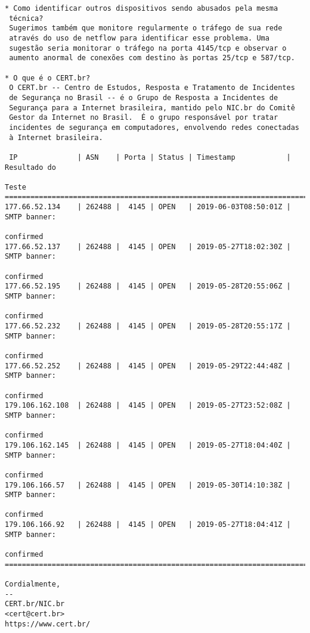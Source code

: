 \begin{verbatim}
* Como identificar outros dispositivos sendo abusados pela mesma
 técnica?
 Sugerimos também que monitore regularmente o tráfego de sua rede
 através do uso de netflow para identificar esse problema. Uma
 sugestão seria monitorar o tráfego na porta 4145/tcp e observar o
 aumento anormal de conexões com destino às portas 25/tcp e 587/tcp.

* O que é o CERT.br?
 O CERT.br -- Centro de Estudos, Resposta e Tratamento de Incidentes
 de Segurança no Brasil -- é o Grupo de Resposta a Incidentes de
 Segurança para a Internet brasileira, mantido pelo NIC.br do Comitê
 Gestor da Internet no Brasil.  É o grupo responsável por tratar
 incidentes de segurança em computadores, envolvendo redes conectadas
 à Internet brasileira.

 IP              | ASN    | Porta | Status | Timestamp            | Resultado do 
                                                                    Teste
=============================================================================
177.66.52.134    | 262488 |  4145 | OPEN   | 2019-06-03T08:50:01Z | SMTP banner: 
                                                                    confirmed
177.66.52.137    | 262488 |  4145 | OPEN   | 2019-05-27T18:02:30Z | SMTP banner: 
                                                                    confirmed
177.66.52.195    | 262488 |  4145 | OPEN   | 2019-05-28T20:55:06Z | SMTP banner: 
                                                                    confirmed
177.66.52.232    | 262488 |  4145 | OPEN   | 2019-05-28T20:55:17Z | SMTP banner: 
                                                                    confirmed
177.66.52.252    | 262488 |  4145 | OPEN   | 2019-05-29T22:44:48Z | SMTP banner: 
                                                                    confirmed
179.106.162.108  | 262488 |  4145 | OPEN   | 2019-05-27T23:52:08Z | SMTP banner: 
                                                                    confirmed
179.106.162.145  | 262488 |  4145 | OPEN   | 2019-05-27T18:04:40Z | SMTP banner: 
                                                                    confirmed
179.106.166.57   | 262488 |  4145 | OPEN   | 2019-05-30T14:10:38Z | SMTP banner: 
                                                                    confirmed
179.106.166.92   | 262488 |  4145 | OPEN   | 2019-05-27T18:04:41Z | SMTP banner: 
                                                                    confirmed
=============================================================================

Cordialmente,
--
CERT.br/NIC.br
<cert@cert.br>
https://www.cert.br/
\end{verbatim}
